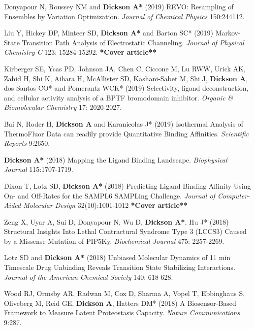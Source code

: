 \documentclass[margin,line]{res}
\begin{document}
\begin{resume}
\begin{spacing}{1.2}
\begin{thebibliography}{10}
  Donyapour N, Roussey NM and {\bf Dickson A*} (2019) REVO: Resampling of Ensembles by Variation Optimization.
  \newblock \textit{Journal of Chemical Physics} 150:244112.

  Liu Y, Hickey DP, Minteer SD, {\bf Dickson A*} and Barton SC* (2019) Markov-State Transition Path Analysis of Electrostatic Channeling.
  \newblock \textit{Journal of Physical Chemistry C} 123: 15284-15292. {\bf **Cover article**}

  Kirberger SE, Ycas PD, Johnson JA, Chen C, Ciccone M, Lu RWW, Urick AK, Zahid H, Shi K, Aihara H, McAllister SD, Kashani-Sabet M, Shi J, {\bf Dickson A}, dos Santos CO* and Pomerantz WCK* (2019) Selectivity, ligand deconstruction, and cellular activity analysis of a BPTF bromodomain inhibitor.
  \newblock \textit{Organic \& Biomolecular Chemistry} 17: 2020-2027.

  Bai N, Roder H, {\bf Dickson A} and Karanicolas J* (2019) Isothermal Analysis of ThermoFluor Data can readily provide Quantitative Binding Affinities.
  \newblock \textit{Scientific Reports} 9:2650.

  {\bf Dickson A*} (2018) Mapping the Ligand Binding Landscape.
  \newblock \textit{Biophysical Journal} 115:1707-1719.

  Dixon T, Lotz SD, {\bf Dickson A*} (2018)
  Predicting Ligand Binding Affinity Using On- and Off-Rates for the SAMPL6 SAMPLing Challenge.
  \newblock \textit{Journal of Computer-Aided Molecular Design} 32(10):1001-1012 {\bf **Cover article**}

  Zeng X, Uyar A, Sui D, Donyapour N, Wu D, {\bf Dickson A*}, Hu J* (2018)
  Structural Insights Into Lethal Contractural Syndrome Type 3 (LCCS3) Caused by a Missense Mutation of PIP5Ky.
  \newblock \textit{Biochemical Journal} 475: 2257-2269.

  Lotz SD and {\bf Dickson A*} (2018)
  Unbiased Molecular Dynamics of 11 min Timescale Drug Unbinding Reveals Transition State Stabilizing Interactions.
\newblock \textit{Journal of the American Chemical Society} 140: 618-628.

  Wood RJ, Ormsby AR, Radwan M, Cox D, Sharma A, Vopel T, Ebbinghaus S, Oliveberg M, Reid GE, {\bf Dickson A}, Hatters DM* (2018)
  A Biosensor-Based Framework to Measure Latent Proteostasis Capacity.
\newblock \textit{Nature Communications} 9:287.


\end{thebibliography}
\end{spacing}
\end{resume}
\end{document}
